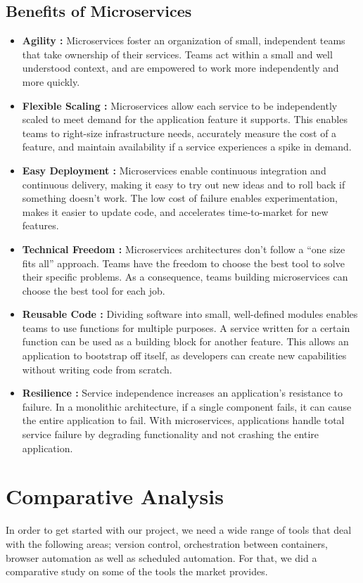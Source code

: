 \subsection{Benefits of Microservices}
\begin{itemize}
	\item \textbf{Agility :} Microservices foster an organization of small, independent teams that take ownership of their services. Teams act within a small and well understood context, and are empowered to work more independently and more quickly.
	\item \textbf{Flexible Scaling :} Microservices allow each service to be independently scaled to meet demand for the application feature it supports. This enables teams to right-size infrastructure needs, accurately measure the cost of a feature, and maintain availability if a service experiences a spike in demand.
	\item \textbf{Easy Deployment :} Microservices enable continuous integration and continuous delivery, making it easy to try out new ideas and to roll back if something doesn’t work. The low cost of failure enables experimentation, makes it easier to update code, and accelerates time-to-market for new features.
	\item \textbf{Technical Freedom :} Microservices architectures don’t follow a “one size fits all” approach. Teams have the freedom to choose the best tool to solve their specific problems. As a consequence, teams building microservices can choose the best tool for each job.
	\item \textbf{Reusable Code :} Dividing software into small, well-defined modules enables teams to use functions for multiple purposes. A service written for a certain function can be used as a building block for another feature. This allows an application to bootstrap off itself, as developers can create new capabilities without writing code from scratch.
	\item \textbf{Resilience :} Service independence increases an application’s resistance to failure. In a monolithic architecture, if a single component fails, it can cause the entire application to fail. With microservices, applications handle total service failure by degrading functionality and not crashing the entire application.
\end{itemize}

\section{Comparative Analysis}
In order to get started with our project, we need a wide range of tools that deal with the following areas; version control, orchestration between containers, browser automation as well as scheduled automation. For that, we did a comparative study on some of the tools the market provides.

